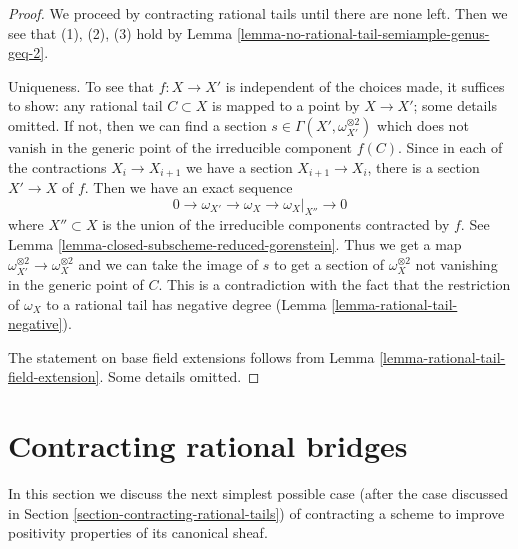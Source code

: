 \documentclass{stacks-project}
\theoremstyle{plain}
\theoremstyle{definition}
\theoremstyle{remark}
\numberwithin{equation}{subsection}
\begin{document}
\begin{proof}
We proceed by contracting rational tails until there are none
left. Then we see that (1), (2), (3) hold by
Lemma \ref{lemma-no-rational-tail-semiample-genus-geq-2}.

\medskip\noindent
Uniqueness. To see that $f : X \to X'$ is independent of the choices
made, it suffices to show: any rational tail $C \subset X$ is
mapped to a point by $X \to X'$; some details omitted.
If not, then we can find a section
$s \in \Gamma(X', \omega_{X'}^{\otimes 2})$ which does
not vanish in the generic point of the irreducible component $f(C)$.
Since in each of the contractions $X_i \to X_{i + 1}$
we have a section $X_{i + 1} \to X_i$, there is a section
$X' \to X$ of $f$. Then we have an exact sequence
$$
0 \to \omega_{X'} \to \omega_X \to \omega_X|_{X''} \to 0
$$
where $X'' \subset X$ is the union of the irreducible components
contracted by $f$. See Lemma \ref{lemma-closed-subscheme-reduced-gorenstein}.
Thus we get a map $\omega_{X'}^{\otimes 2} \to \omega_X^{\otimes 2}$
and we can take the image of $s$ to get a section of
$\omega_X^{\otimes 2}$ not vanishing in the generic point of $C$.
This is a contradiction with the fact that the restriction of
$\omega_X$ to a rational tail has negative degree
(Lemma \ref{lemma-rational-tail-negative}).

\medskip\noindent
The statement on base field extensions follows from
Lemma \ref{lemma-rational-tail-field-extension}. Some details omitted.
\end{proof}





\section{Contracting rational bridges}
\label{section-contracting-rational-bridges}

\noindent
In this section we discuss the next simplest possible case (after the case
discussed in Section \ref{section-contracting-rational-tails}) of contracting
a scheme to improve positivity properties of its canonical sheaf.
\end{document}
